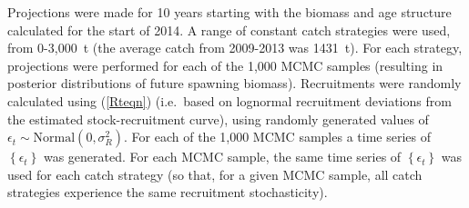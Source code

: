 \documentclass[11pt]{article}   %
\def\finalYr{2014}               %
\newcommand{\eref}[1]{(\ref{#1})}
\newcommand{\eb}{\begin{eqnarray}}
\newcommand{\ee}{\end{eqnarray}}
\begin{document}
Projections were made for 10 years %
starting with the biomass and age structure calculated for the start of \finalYr.  A range of constant catch strategies were used, from 0-3,000~t (the average catch from 2009-2013 was 1431~t). For each strategy, projections were performed for each of the 1,000 MCMC samples (resulting in posterior distributions of future spawning biomass). Recruitments were randomly calculated using \eref{Rteqn} (i.e.~based on lognormal recruitment deviations from the estimated stock-recruitment curve), using randomly generated values of $\epsilon_t \sim \mbox{Normal}(0, \sigma_R^2)$. For each of the 1,000 MCMC samples a time series of $\left\{ \epsilon_t \right\}$ was generated. For each MCMC sample, the same time series of $\left\{ \epsilon_t \right\}$ was used for each catch strategy (so that, for a given MCMC sample, all catch strategies experience the same recruitment stochasticity).


\end{document}
